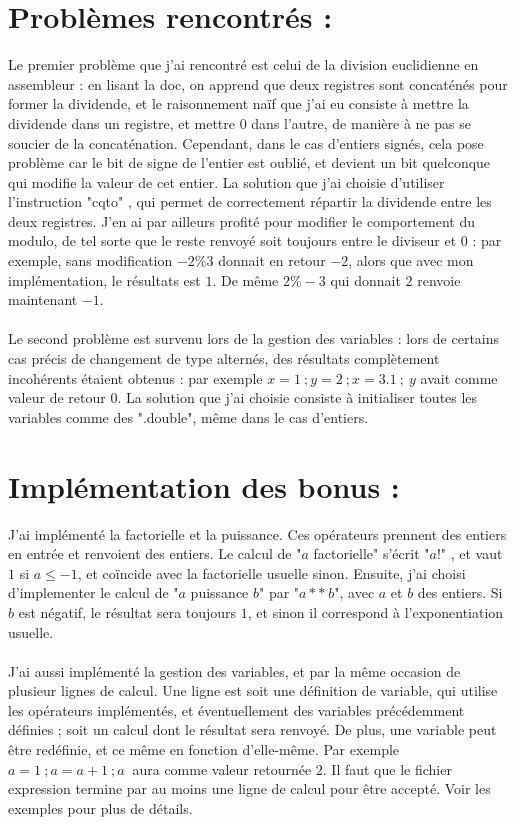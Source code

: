 \documentclass[11pt,a4paper]{article}
\begin{document}
\section{Problèmes rencontrés :}
 Le premier problème que j'ai rencontré est celui de la division euclidienne en assembleur : en lisant la doc, on apprend que deux registres sont concaténés pour former la dividende, et le raisonnement naïf que j'ai eu consiste à mettre la dividende dans un registre, et mettre 0 dans l'autre, de manière à ne pas se soucier de la concaténation. Cependant, dans le cas d'entiers signés, cela pose problème car le bit de signe de l'entier est oublié, et devient un bit quelconque qui modifie la valeur de cet entier. La solution que j'ai choisie d'utiliser l'instruction "cqto" , qui permet de correctement répartir la dividende entre les deux registres. J'en ai par ailleurs profité pour modifier le comportement du modulo, de tel sorte que le reste renvoyé soit toujours entre le diviseur et 0 : par exemple, sans modification $ -2 \% 3 $ donnait en retour $-2$, alors que avec mon implémentation, le résultats est $1$. De même $2 \%-3$ qui donnait $2$ renvoie maintenant $-1$. \\ \\
Le second problème est survenu lors de la gestion des variables : lors de certains cas précis de changement de type alternés, des résultats complètement incohérents étaient obtenus : par exemple $x=1 \ ; y=2 \ ; x=3.1 \ ; \ y$ avait comme valeur de retour $0$. La solution que j'ai choisie consiste à initialiser toutes les variables comme des ".double", même dans le cas d'entiers.

\section{Implémentation des bonus :}
J'ai implémenté la factorielle et la puissance. Ces opérateurs prennent des entiers en entrée et renvoient des entiers. Le calcul de "$a$ factorielle" s'écrit "$a!$" , et vaut $1$ si $a \leq -1$, et coïncide avec la factorielle usuelle sinon. Ensuite, j'ai choisi d'implementer le calcul de "$a$ puissance $b$" par "$a** \ b$", avec $a$ et $b$ des entiers. Si $b$ est négatif, le résultat sera toujours $1$, et sinon il correspond à l'exponentiation usuelle. \\ \\
J'ai aussi implémenté la gestion des variables, et par la même occasion de plusieur lignes de calcul. Une ligne est soit une définition de variable, qui utilise les opérateurs implémentés, et éventuellement des variables précédemment définies ; soit un calcul dont le résultat sera renvoyé. De plus, une variable peut être redéfinie, et ce même en fonction d'elle-même. Par exemple $a=1 \ ; a=a+1 \ ; a \ $ aura comme valeur retournée $2$. Il faut que le fichier expression termine par au moins une ligne de calcul pour être accepté. Voir les exemples pour plus de détails.
\end{document}
